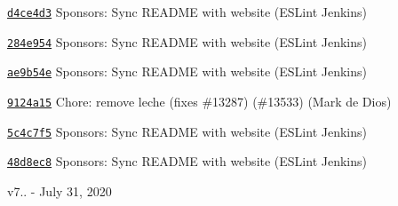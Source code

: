 \begin{DoxyItemize}
\item \href{https://github.com/eslint/eslint/commit/d4ce4d3b8492c3e4654ed1f51f2c48e6c0ad272f}{\texttt{ {\ttfamily d4ce4d3}}} Sponsors\+: Sync README with website (ESLint Jenkins)
\item \href{https://github.com/eslint/eslint/commit/284e954f93126c50e0aa9b88f42afb03a47ad967}{\texttt{ {\ttfamily 284e954}}} Sponsors\+: Sync README with website (ESLint Jenkins)
\item \href{https://github.com/eslint/eslint/commit/ae9b54e59b01aa9f50ee31f5b6787d86e6b59de6}{\texttt{ {\ttfamily ae9b54e}}} Sponsors\+: Sync README with website (ESLint Jenkins)
\item \href{https://github.com/eslint/eslint/commit/9124a1599638a1caf4b7e252d1cb66abdc5e51c6}{\texttt{ {\ttfamily 9124a15}}} Chore\+: remove leche (fixes \#13287) (\#13533) (Mark de Dios)
\item \href{https://github.com/eslint/eslint/commit/5c4c7f515c2e8e83f2186a66ddce75d6477abeb0}{\texttt{ {\ttfamily 5c4c7f5}}} Sponsors\+: Sync README with website (ESLint Jenkins)
\item \href{https://github.com/eslint/eslint/commit/48d8ec8cf320c69aed17c6b6c78f19e7c1e587ca}{\texttt{ {\ttfamily 48d8ec8}}} Sponsors\+: Sync README with website (ESLint Jenkins)
\end{DoxyItemize}

v7.. -\/ July 31, 2020


